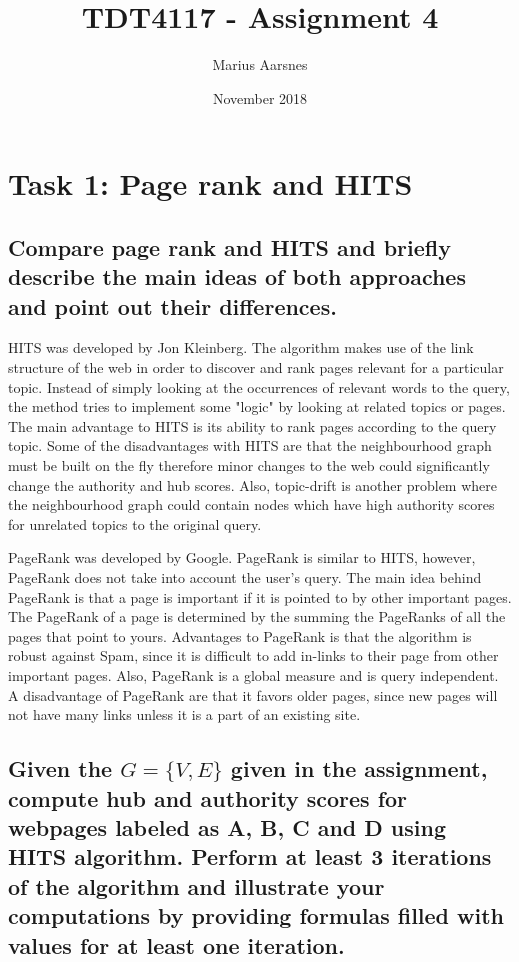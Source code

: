 \documentclass{article}
\title{TDT4117 - Assignment 4}
\author{Marius Aarsnes}
\date{November 2018}
\begin{document}
\maketitle

\section{Task 1: Page rank and HITS}

\subsection{Compare page rank and HITS and briefly describe the main ideas of both approaches and point out their differences.}

HITS was developed by Jon Kleinberg. The algorithm makes use of the link structure of the web in order to discover and rank pages relevant for a particular topic. Instead of simply looking at the occurrences of relevant words to the query, the method tries to implement some "logic" by looking at related topics or pages. The main advantage to HITS is its ability to rank pages according to the query topic. Some of the disadvantages with HITS are that the neighbourhood graph must be built on the fly therefore minor changes to the web could significantly change the authority and hub scores. Also, topic-drift is another problem where the neighbourhood graph could contain nodes which have high authority scores for unrelated topics to the original query. 

\vspace{2mm}

\noindent PageRank was developed by Google. PageRank is similar to HITS, however, PageRank does not take into account the user's query. The main idea behind PageRank is that a page is important if it is pointed to by other important pages. The PageRank of a page is determined by the summing the PageRanks of all the pages that point to yours. Advantages to PageRank is that the algorithm is robust against Spam, since it is difficult to add in-links to their page from other important pages. Also, PageRank is a global measure and is query independent. A disadvantage of PageRank are that it favors older pages, since new pages will not have many links unless it is a part of an existing site. 

\newpage
\subsection{Given the $G=\{V,E\}$ given in the assignment, compute hub and authority scores for webpages labeled as A, B, C and D using HITS algorithm. Perform at least 3 iterations of the algorithm and illustrate your computations by providing formulas filled with values for at least one iteration.}
\end{document}

